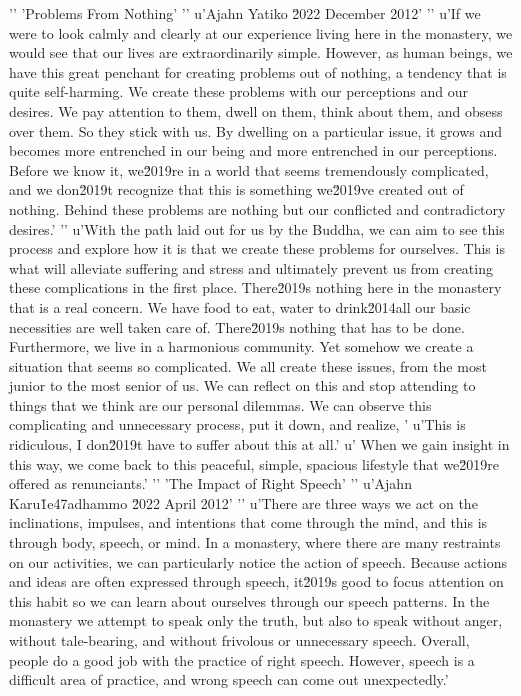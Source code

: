 '\n'
'Problems From Nothing'
'\n'
u'Ajahn Yatiko \u2022 December 2012'
'\n'
u'If we were to look calmly and clearly at our experience living here in the monastery, we would see that our lives are extraordinarily simple. However, as human beings, we have this great penchant for creating problems out of nothing, a tendency that is quite self-harming. We create these problems with our perceptions and our desires. We pay attention to them, dwell on them, think about them, and obsess over them. So they stick with us. By dwelling on a particular issue, it grows and becomes more entrenched in our being and more entrenched in our perceptions. Before we know it, we\u2019re in a world that seems tremendously complicated, and we don\u2019t recognize that this is something we\u2019ve created out of nothing. Behind these problems are nothing but our conflicted and contradictory desires.'
'\n'
u'With the path laid out for us by the Buddha, we can aim to see this process and explore how it is that we create these problems for ourselves. This is what will alleviate suffering and stress and ultimately prevent us from creating these complications in the first place. There\u2019s nothing here in the monastery that is a real concern. We have food to eat, water to drink\u2014all our basic necessities are well taken care of. There\u2019s nothing that has to be done. Furthermore, we live in a harmonious community. Yet somehow we create a situation that seems so complicated. We all create these issues, from the most junior to the most senior of us. We can reflect on this and stop attending to things that we think are our personal dilemmas. We can observe this complicating and unnecessary process, put it down, and realize, '
u'This is ridiculous, I don\u2019t have to suffer about this at all.'
u' When we gain insight in this way, we come back to this peaceful, simple, spacious lifestyle that we\u2019re offered as renunciants.'
'\n'
'The Impact of Right Speech'
'\n'
u'Ajahn Karu\u1e47adhammo \u2022 April 2012'
'\n'
u'There are three ways we act on the inclinations, impulses, and intentions that come through the mind, and this is through body, speech, or mind. In a monastery, where there are many restraints on our activities, we can particularly notice the action of speech. Because actions and ideas are often expressed through speech, it\u2019s good to focus attention on this habit so we can learn about ourselves through our speech patterns. In the monastery we attempt to speak only the truth, but also to speak without anger, without tale-bearing, and without frivolous or unnecessary speech. Overall, people do a good job with the practice of right speech. However, speech is a difficult area of practice, and wrong speech can come out unexpectedly.'
